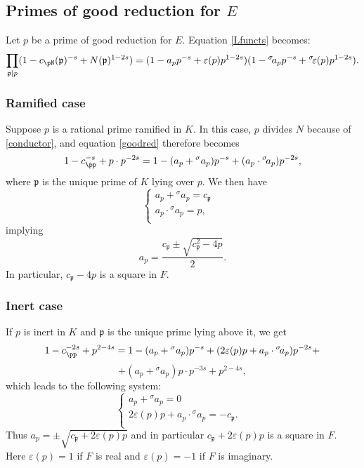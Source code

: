 \documentclass[11pt]{amsart}
\theoremstyle{definition}
\begin{document}
	  \subsection{Primes of good reduction for
\texorpdfstring{$E$}{}}
	  Let $p$ be a prime of good reduction for $E$. Equation \eqref{Lfuncts} becomes:
	  \begin{equation}\label{goodred}
			    \prod_{{\mathfrak{p}}\mid p}(1-c_\pN({\mathfrak{p}})^{-s}+N({\mathfrak{p}})^{1-2s})=(1-a_pp^{-s}+\varepsilon(p)p^{1-2s})(1-{{}^\sigma\!} a_pp^{-s}+{{}^\sigma\!}\varepsilon(p)p^{1-2s}).
		\end{equation}
	  \subsubsection*{Ramified case}
	  Suppose $p$ is a rational prime ramified in $K$. In this case, $p$ divides $N$ because of \eqref{conductor}, and equation \eqref{goodred} therefore becomes
	  $$1-c_\pp^{-s}+p\cdot p^{-2s}=1-(a_p+{}^{\sigma}a_p)p^{-s}+(a_p\cdot{{}^\sigma\!} a_p)p^{-2s},$$
	  where ${\mathfrak{p}}$ is the unique prime of $K$ lying over $p$. We then have
	  $$\begin{cases}
      a_p+{}^{\sigma}a_{p}=c_{\mathfrak{p}} & \\
      a_p\cdot{}^{\sigma}a_p=p, & \\
	\end{cases}$$
	  implying
	  $$a_p=\frac{c_{\mathfrak{p}}\pm\sqrt{c_{\mathfrak{p}}^2-4p}}{2}.$$
	  In particular, $c_{\mathfrak{p}}-4p$ is a square in $F$.
	  \subsubsection*{Inert case}
	  If $p$ is inert in $K$ and ${\mathfrak{p}}$ is the unique prime lying above it, we get
		$$1-c_\pp^{-2s}+p^{2-4s}=1-(a_p+{}^{\sigma}a_p)p^{-s}+(2\varepsilon(p)p+a_p\cdot {{}^\sigma\!} a_p)p^{-2s}+$$
	  $$+(a_p+{}^{\sigma}a_p)p\cdot p^{-3s}+p^{2-4s},$$
	  which leads to the following system:
	  $$\begin{cases}
      a_p+{}^{\sigma}a_p=0 & \\
      2\varepsilon(p)p+a_p\cdot {}^{\sigma}a_p=-c_{\mathfrak{p}}. & \\
	\end{cases}$$
	  Thus $a_p=\pm\sqrt{c_{\mathfrak{p}}+2\varepsilon(p)p}$ and in particular $c_{\mathfrak{p}}+2\varepsilon(p)p$ is a square in $F$. Here $\varepsilon(p)=1$ if $F$ is real and $\varepsilon(p)=-1$ if $F$ is imaginary.
\end{document}
